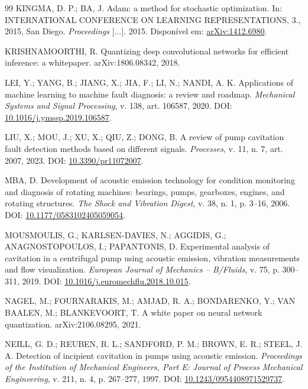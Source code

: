 \documentclass[12pt]{article}
\begin{document}
{\begin{thebibliography}{99}
	KINGMA, D. P.; BA, J.
	\newblock Adam: a method for stochastic optimization.
	\newblock In: INTERNATIONAL CONFERENCE ON LEARNING REPRESENTATIONS, 3., 2015, San Diego. \emph{Proceedings} [...]. 2015.
	\newblock Disponível em: \href{https://arxiv.org/abs/1412.6980}{arXiv:1412.6980}.

	KRISHNAMOORTHI, R.
	\newblock Quantizing deep convolutional networks for efficient inference: a whitepaper.
	\newblock arXiv:1806.08342, 2018.

	LEI, Y.; YANG, B.; JIANG, X.; JIA, F.; LI, N.; NANDI, A. K.
	\newblock Applications of machine learning to machine fault diagnosis: a review and roadmap.
	\newblock \emph{Mechanical Systems and Signal Processing}, v. 138, art. 106587, 2020.
	\newblock DOI: \href{https://doi.org/10.1016/j.ymssp.2019.106587}{10.1016/j.ymssp.2019.106587}.

	LIU, X.; MOU, J.; XU, X.; QIU, Z.; DONG, B.
	\newblock A review of pump cavitation fault detection methods based on different signals.
	\newblock \emph{Processes}, v. 11, n. 7, art. 2007, 2023.
	\newblock DOI: \href{https://doi.org/10.3390/pr11072007}{10.3390/pr11072007}.

	MBA, D.
	\newblock Development of acoustic emission technology for condition monitoring and diagnosis of rotating machines: bearings, pumps, gearboxes, engines, and rotating structures.
	\newblock \emph{The Shock and Vibration Digest}, v. 38, n. 1, p. 3--16, 2006.
	\newblock DOI: \href{https://doi.org/10.1177/0583102405059054}{10.1177/0583102405059054}.

	MOUSMOULIS, G.; KARLSEN-DAVIES, N.; AGGIDIS, G.; ANAGNOSTOPOULOS, I.; PAPANTONIS, D.
	\newblock Experimental analysis of cavitation in a centrifugal pump using acoustic emission, vibration measurements and flow visualization.
	\newblock \emph{European Journal of Mechanics -- B/Fluids}, v. 75, p. 300--311, 2019.
	\newblock DOI: \href{https://doi.org/10.1016/j.euromechflu.2018.10.015}{10.1016/j.euromechflu.2018.10.015}.

	NAGEL, M.; FOURNARAKIS, M.; AMJAD, R. A.; BONDARENKO, Y.; VAN BAALEN, M.; BLANKEVOORT, T.
	\newblock A white paper on neural network quantization.
	\newblock arXiv:2106.08295, 2021.

	NEILL, G. D.; REUBEN, R. L.; SANDFORD, P. M.; BROWN, E. R.; STEEL, J. A.
	\newblock Detection of incipient cavitation in pumps using acoustic emission.
	\newblock \emph{Proceedings of the Institution of Mechanical Engineers, Part E: Journal of Process Mechanical Engineering}, v. 211, n. 4, p. 267--277, 1997.
	\newblock DOI: \href{https://doi.org/10.1243/0954408971529737}{10.1243/0954408971529737}.


\end{thebibliography}}
\end{document}
